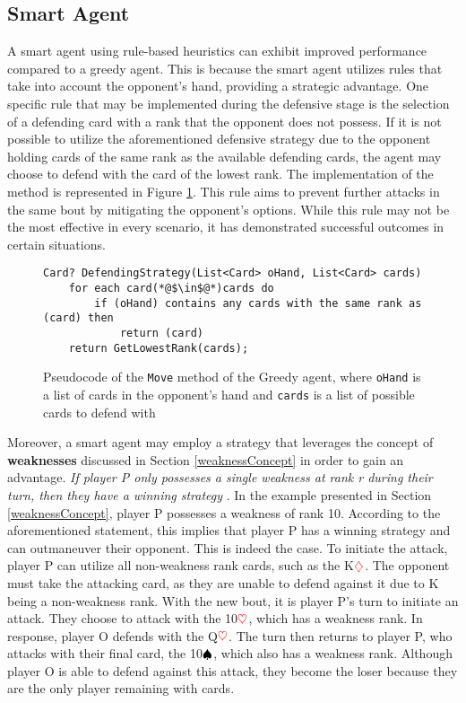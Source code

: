 \subsection{Smart Agent}
\label{smart}
A smart agent using rule-based heuristics can exhibit improved performance compared to a greedy agent. This is because the smart agent utilizes rules that take into account the opponent's hand, providing a strategic advantage. One specific rule that may be implemented during the defensive stage is the selection of a defending card with a rank that the opponent does not possess. If it is not possible to utilize the aforementioned defensive strategy due to the opponent holding cards of the same rank as the available defending cards, the agent may choose to defend with the card of the lowest rank.  The implementation of the method is represented in Figure \ref{fig:defStratSmart}. This rule aims to prevent further attacks in the same bout by mitigating the opponent's options. While this rule may not be the most effective in every scenario, it has demonstrated successful outcomes in certain situations.

\begin{figure}[h]
\captionsetup{justification=centering}
\begin{lstlisting}
Card? DefendingStrategy(List<Card> oHand, List<Card> cards)
	for each card(*@$\in$@*)cards do
		if (oHand) contains any cards with the same rank as (card) then
			return (card)
	return GetLowestRank(cards);

\end{lstlisting}
\caption{Pseudocode of the \texttt{Move} method of the Greedy agent, where \texttt{oHand} is a list of cards in the opponent's hand and \texttt{cards} is a list of possible cards to defend with}
\label{fig:defStratSmart}
\end{figure}

Moreover, a smart agent may employ a strategy that leverages the concept of \textbf{weaknesses} discussed in Section \ref{weaknessConcept} in order to gain an advantage. \textit{If player P only possesses a single weakness at rank r during their turn, then they have a winning strategy} \citep{Bonnet2016TheCO}. In the example presented in Section \ref{weaknessConcept}, player P possesses a weakness of rank 10. According to the aforementioned statement, this implies that player P has a winning strategy and can outmaneuver their opponent. This is indeed the case. To initiate the attack, player P can utilize all non-weakness rank cards, such as the K$\textcolor{red}{\diamondsuit}$. The opponent must take the attacking card, as they are unable to defend against it due to K being a non-weakness rank. With the new bout, it is player P's turn to initiate an attack. They choose to attack with the 10$\textcolor{red}{\heartsuit}$, which has a weakness rank. In response, player O defends with the Q$\textcolor{red}{\heartsuit}$. The turn then returns to player P, who attacks with their final card, the 10$\textcolor{black}{\spadesuit}$, which also has a weakness rank. Although player O is able to defend against this attack, they become the loser because they are the only player remaining with cards.

